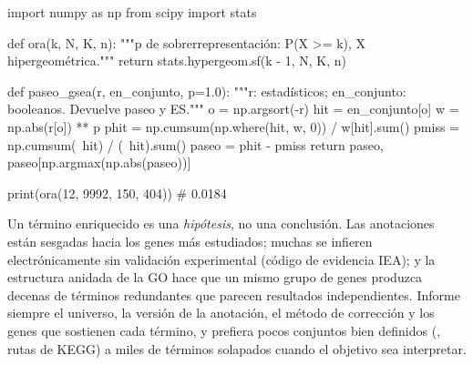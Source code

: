 \begin{codigo}
import numpy as np
from scipy import stats

def ora(k, N, K, n):
    """p de sobrerrepresentación: P(X >= k), X hipergeométrica."""
    return stats.hypergeom.sf(k - 1, N, K, n)

def paseo_gsea(r, en_conjunto, p=1.0):
    """r: estadísticos; en_conjunto: booleanos. Devuelve paseo y ES."""
    o = np.argsort(-r)
    hit = en_conjunto[o]
    w = np.abs(r[o]) ** p
    phit = np.cumsum(np.where(hit, w, 0)) / w[hit].sum()
    pmiss = np.cumsum(~hit) / (~hit).sum()
    paseo = phit - pmiss
    return paseo, paseo[np.argmax(np.abs(paseo))]

print(ora(12, 9992, 150, 404))      # 0.0184
\end{codigo}

\begin{cuidado}
Un término enriquecido es una \emph{hipótesis}, no una conclusión. Las anotaciones están sesgadas hacia los genes más estudiados; muchas se infieren electrónicamente sin validación experimental (código de evidencia IEA); y la estructura anidada de la GO hace que un mismo grupo de genes produzca decenas de términos redundantes que parecen resultados independientes. Informe siempre el universo, la versión de la anotación, el método de corrección y los genes que sostienen cada término, y prefiera pocos conjuntos bien definidos (, rutas de KEGG) a miles de términos solapados cuando el objetivo sea interpretar.
\end{cuidado}

